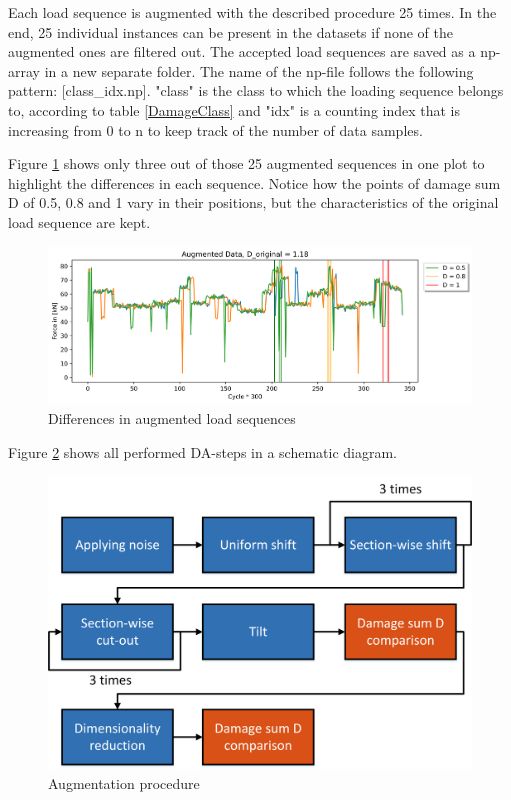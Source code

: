 Each load sequence is augmented with the described procedure 25 times. In the end, 25 individual instances can be present in the datasets if none of the augmented ones are filtered out. 
The accepted load sequences are saved as a np-array in a new separate folder. The name of the np-file follows the following pattern: [class\_idx.np]. "class" is the class to which the loading sequence belongs to, according to table \ref{DamageClass} and "idx" is a counting index that is increasing from 0 to n to keep track of the number of data samples.

Figure \ref{fig:3in1} shows only three out of those 25 augmented sequences in one plot to highlight the differences in each sequence.
Notice how the points of damage sum D of 0.5, 0.8 and 1 vary in their positions, but the characteristics of the original load sequence are kept.

\begin{figure}[H]
	\centering
	\includegraphics[width=1\linewidth]{IMGs/Augmented_5.png}
	\caption{Differences in augmented load sequences}
	\label{fig:3in1}
\end{figure}

Figure \ref{fig:allDA} shows all performed DA-steps in a schematic diagram.

\begin{figure}[H]
	\centering
	\includegraphics[width=0.7\linewidth]{IMGs/Augmentation.png}
	\caption{Augmentation procedure}
	\label{fig:allDA}
\end{figure}

